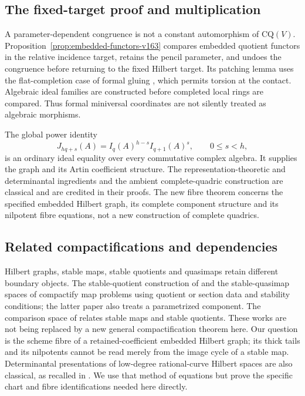 \subsection{The fixed-target proof and multiplication}
A parameter-dependent congruence is not a constant automorphism
of $\mathrm{CQ}(V)$. Proposition~\ref{prop:embedded-functors-v163}
compares embedded quotient functors in the relative incidence
target, retains the pencil parameter, and undoes the congruence
before returning to the fixed Hilbert target. Its patching lemma
uses the flat-completion case of formal gluing
\cite[Proposition~5.6(4), Example~5.8]{Bhatt163}, which permits
torsion at the contact. Algebraic ideal families are constructed
before completed local rings are compared. Thus formal miniversal
coordinates are not silently treated as algebraic morphisms.

The global power identity
\[
       J_{hq+s}(A)=I_q(A)^{h-s}I_{q+1}(A)^s,\qquad 0\leq s<h,
\]
is an ordinary ideal equality over every commutative complex
algebra. It supplies the graph and its Artin coefficient structure.
The representation-theoretic and determinantal ingredients and
the ambient complete-quadric construction are classical and are
credited in their proofs. The new fibre theorem concerns the
specified embedded Hilbert graph, its complete component structure
and its nilpotent fibre equations, not a new construction of
complete quadrics.

\subsection{Related compactifications and dependencies}
Hilbert graphs, stable maps, stable quotients and quasimaps retain
different boundary objects. The stable-quotient construction of
\cite{MOP163} and the stable-quasimap spaces of \cite{CFKM163}
compactify map problems using quotient or section data and
stability conditions; the latter paper also treats a parametrized
component. The comparison space of \cite{Manolache163} relates
stable maps and stable quotients. These works are not being
replaced by a new general compactification theorem here. Our
question is the scheme fibre of a retained-coefficient embedded
Hilbert graph; its thick tails and its nilpotents cannot be read
merely from the image cycle of a stable map. Determinantal
presentations of low-degree rational-curve Hilbert spaces are
also classical, as recalled in \cite[\S1.1--1.2]{LLMS163}. We use that
method of equations but prove the specific chart and fibre
identifications needed here directly.

